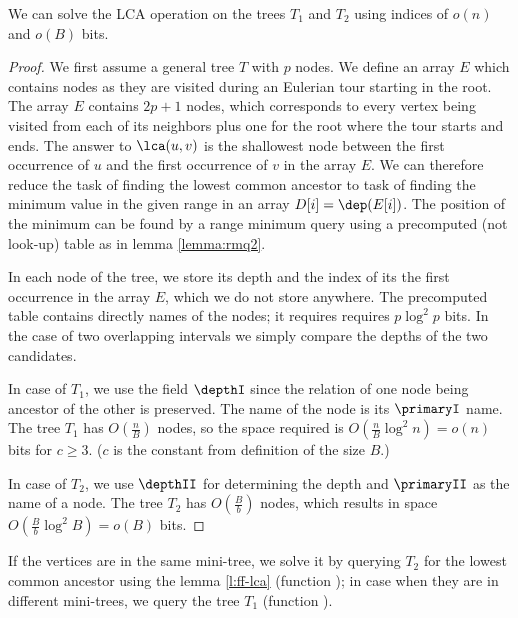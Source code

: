 \begin{lemma}\label{l:ff-lca}
	We can solve the LCA operation on the trees $T_1$ and $T_2$ using indices of $o(n)$ and $o(B)$ bits.
\end{lemma}
\begin{proof}
	We first assume a general tree $T$ with $p$ nodes.
	We define an array $E$ which contains nodes as they are visited during an Eulerian tour starting in the root.
	The array $E$ contains $2p + 1$ nodes, which corresponds to every vertex being visited from each of its neighbors plus one for the root where the tour starts and ends.
	The answer to $\lca(u, v)$ is the shallowest node between the first occurrence of $u$ and the first occurrence of $v$ in the array $E$.
	We can therefore reduce the task of finding the lowest common ancestor to task of finding the minimum value in the given range in an array $D[i] = \dep(E[i])$.
	The position of the minimum can be found by a range minimum query using a precomputed (not look-up) table as in lemma \ref{lemma:rmq2}.
	
	In each node of the tree, we store its depth and the index of its the first occurrence in the array $E$, which we do not store anywhere.
	The precomputed table contains directly names of the nodes; it requires requires $p \log^2 p$ bits.
	In the case of two overlapping intervals we simply compare the depths of the two candidates.
	
	In case of $T_1$, we use the field $\depthI$ since the relation of one node being ancestor of the other is preserved.
	The name of the node is its $\primaryI$ name.
	The tree $T_1$ has $O(\frac{n}{B})$ nodes, so the space required is $O(\frac{n}{B} \log^2 n) = o(n)$ bits for $c \ge 3$.
	($c$ is the constant from definition of the size $B$.)
	
	In case of $T_2$, we use $\depthII$ for determining the depth and $\primaryII$ as the name of a node.
	The tree $T_2$ has $O(\frac{B}{b})$ nodes, which results in space $O(\frac{B}{b} \log^2 B) = o(B)$ bits.
\end{proof}

If the vertices are in the same mini-tree, we solve it by querying $T_2$ for the lowest common ancestor using the lemma \ref{l:ff-lca} (function \lcaI); in case when they are in different mini-trees, we query the tree $T_1$ (function \lcaII).

